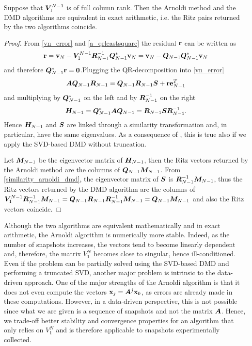 \begin{prop}
Suppose that $\vb*{V}_1^{N-1}$ is of full column rank. Then the Arnoldi method and the DMD algorithms are equivalent in exact arithmetic, i.e. the Ritz pairs returned by the two algorithms coincide. 
\end{prop}
\begin{proof}
From \eqref{vn_error} and \eqref{a_qrleastsquare} the residual $\vb{r}$ can be written as
\begin{equation*}
    \vb{r} = \vb{v}_N - \vb*{V}_1^{N-1}\vb*{R}_{N-1}^{-1}\vb*{Q}_{N-1}^*\vb{v}_N = \vb{v}_N - \vb*{Q}_{N-1}\vb*{Q}_{N-1}^*\vb{v}_N
\end{equation*}
and therefore $\vb*{Q}_{N-1}^*\vb{r} = \vb*{0}$.Plugging the QR-decomposition into \eqref{vn_error}
\begin{equation*}
    \vb*{A}\vb*{Q}_{N-1}\vb*{R}_{N-1} = \vb*{Q}_{N-1}\vb*{R}_{N-1}\vb*{S} + \vb{r}\vb{e}_{N-1}^T
\end{equation*}
and multiplying by $\vb*{Q}_{N-1}^*$ on the left and by $\vb*{R}_{N-1}^{-1}$ on the right
\begin{equation}
    \label{similarity_arnoldi_dmd}
    \vb*{H}_{N-1} = \vb*{Q}_{N-1}^*\vb*{A}\vb*{Q}_{N-1} = \vb*{R}_{N-1}\vb*{S}\vb*{R}_{N-1}^{-1}.
\end{equation}
Hence $\vb*{H}_{N-1}$ and $\vb*{S}$ are linked through a similarity transformation and, in particular, have the same eigenvalues. As a consequence of , this is true also if we apply the SVD-based DMD without truncation.

Let $\vb*{M}_{N-1}$ be the eigenvector matrix of $\vb*{H}_{N-1}$, then the Ritz vectors returned by the Arnoldi method are the columns of $\vb*{Q}_{N-1}\vb*{M}_{N-1}$. From \eqref{similarity_arnoldi_dmd}, the eigenvector matrix of $\vb*{S}$ is $\vb*{R}_{N-1}^{-1}\vb*{M}_{N-1}$, thus the Ritz vectors returned by the DMD algorithm are the columns of $\vb*{V}_1^{N-1}\vb*{R}_{N-1}^{-1}\vb*{M}_{N-1} = \vb*{Q}_{N-1}\vb*{R}_{N-1}\vb*{R}_{N-1}^{-1}\vb*{M}_{N-1} = \vb*{Q}_{N-1}\vb*{M}_{N-1}$ and also the Ritz vectors coincide.
\end{proof}


Although the two algorithms are equivalent mathematically and in exact arithmetic, the Arnoldi algorithm is numerically more stable. Indeed, as the number of snapshots increases, the vectors tend to become linearly dependent and, therefore, the matrix $V_1^N$ becomes close to singular, hence ill-conditioned. Even if the problem can be partially solved using the SVD-based DMD and performing a truncated SVD, another major problem is intrinsic to the data-driven approach. One of the major strengths of the Arnoldi algorithm is that it does not even compute the vectors $\vb{x}_j = \vb*{A}^j \vb{x}_0$, as errors are already made in these computations. However, in a data-driven perspective, this is not possible since what we are given is a sequence of snapshots and not the matrix $\vb*{A}$. Hence, we trade-off better stability and convergence properties for an algorithm that only relies on $V_1^N$ and is therefore applicable to snapshots experimentally collected.

